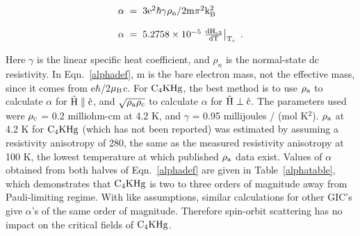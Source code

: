 \begin{equation}
\label{alphadef}
\begin{array}{l}
\rm \alpha \; = \; 3e^2\hbar \gamma \rho_n/2 m \pi^2 k_B^2 \\
\\
\rm \alpha \; = \; 5.2758\times10^{-5} \left. \frac{dH_{c2}}{dT}
\right|_{T_c} \; .
\end{array}
\end{equation}

\noindent Here $\gamma$ is the linear specific heat coefficient, and $\rho_n$
is the  normal-state dc resistivity.  In   Eqn.~\ref{alphadef}, m is the bare
electron mass, not the effective  mass, since it comes from  e$\hbar$/2$\rm
\mu_B$c.\cite{decroux82} For $\rm  C_4KHg$, the best method  is to use $\rm
\rho_a$ to calculate $\alpha$ for $\rm \vec{H} \parallel \hat{c}$, and $\rm
\sqrt{\rho_a
\rho_c}$ to   calculate  $\alpha$ for   $\rm \vec{H} \perp  \hat{c}$.   The
parameters    used  were  $\rm   \rho_c$    =  0.2  milliohm-cm     at  4.2
K,\cite{fischer83}    and    $\gamma$   =    0.95   millijoules    /   (mol
K$^2$)\cite{alexander81}.  $\rm  \rho_a$ at 4.2 K  for $\rm  C_4KHg$ (which
has not been reported) was estimated  by assuming a  resistivity anisotropy
of 280,  the  same  as the measured  resistivity anisotropy at  100  K, the
lowest   temperature    at  which    published     $\rm    \rho_a$     data
exist.\cite{elmakrini80}  Values  of $\alpha$ obtained  from both halves of
Eqn.~\ref{alphadef}    are      given       in      Table~\ref{alphatable},
which  demonstrates   that $\rm C_4KHg$  is  two to  three
orders of  magnitude  away from  Pauli-limiting regime.   With like  assumptions,
similar calculations for other GIC's give $\alpha$'s  of the same  order of
magnitude.  Therefore spin-orbit  scattering has no impact  on the critical
fields of $\rm C_4KHg$.

